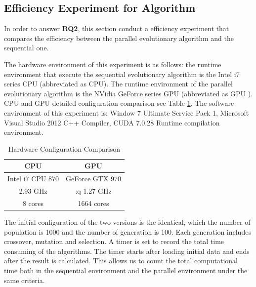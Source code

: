 \subsection{Efficiency Experiment for Algorithm}
%
In order to answer \textbf{RQ2}, this section conduct a efficiency experiment
that compares the efficiency between the parallel evolutionary algorithm and the
sequential one.

The hardware environment of this experiment is as follows: the runtime
environment that execute the sequential evolutionary algorithm is the Intel i7
series CPU (abbreviated as CPU). The runtime environment of the parallel
evolutionary algorithm is the NVidia GeForce series GPU (abbreviated as GPU
). CPU and GPU detailed configuration comparison see Table \ref{tab:cpugpu}. The
software environment of this experiment is: Window 7 Ultimate Service Pack 1,
Microsoft Visual Studio 2012 C++ Compiler, CUDA 7.0.28 Runtime compilation
environment.

\begin{table}[!ht]
  \centering
  \caption{Hardware Configuration Comparison}
  \label{tab:cpugpu}
  \begin{tabular}{c|c}
    \hline
    CPU & GPU  \\
    \hline
    \hspace{.5cm} Intel i7 CPU 870 \hspace{.5cm} & \hspace{.5cm} GeForce GTX 970 \hspace{.5cm} \\
    2.93 GHz &:q 1.27 GHz \\
    8 cores & 1664 cores \\
    \hline
  \end{tabular}
\end{table}

The initial configuration of the two versions is the identical, which the number
of population is 1000 and the number of generation is 100. Each generation
includes crossover, mutation and selection. A timer is set to record the total
time consuming of the algorithms. The timer starts after loading initial data
and ends after the result is calculated. This allows us to count the total
computational time both in the sequential environment and the parallel
environment under the same criteria.


